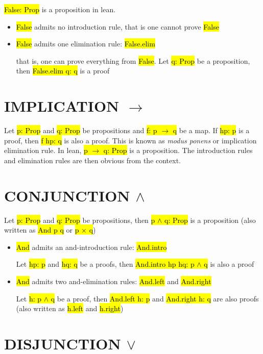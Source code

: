 \hl{False: Prop} is a proposition in lean.

\begin{itemize}
	\item \hl{False} admits no introduction rule, that is one cannot prove \hl{False}
	
	\item \hl{False} admits one elimination rule: \hl{False.elim}
	
	that is, one can prove everything from \hl{False}. Let \hl{q: Prop} be a proposition, then \hl{False.elim q: q} is a proof
\end{itemize}



\section{IMPLICATION $\to$}

Let \hl{p: Prop} and \hl{q: Prop} be propositions and \hl{f: p $\to$ q} be a map. If \hl{hp: p} is a proof, then \hl{f hp: q} is also a proof. This is known as \textit{modus ponens} or implication elimination rule. In lean, \hl{p $\to$ q: Prop} is a proposition. The introduction rules and elimination rules are then obvious from the context.

\section{CONJUNCTION $\land$}

Let \hl{p: Prop} and \hl{q: Prop} be propositions, then \hl{p $\land$ q: Prop} is a proposition (also written as \hl{And p q} or \hl{p $\times$ q})

\begin{itemize}
	\item \hl{And} admits an and-introduction rule: \hl{And.intro}
	
	Let \hl{hp: p} and \hl{hq: q} be a proofs, then \hl{And.intro hp hq: p $\land$ q} is also a proof
	
	\item \hl{And} admits two and-elimination rules: \hl{And.left} and \hl{And.right}
	
	Let \hl{h: p $\land$ q} be a proof, then \hl{And.left h: p} and \hl{And.right h: q} are also proofs (also written as \hl{h.left} and \hl{h.right})
	
	
\end{itemize}


\section{DISJUNCTION $\lor$}

